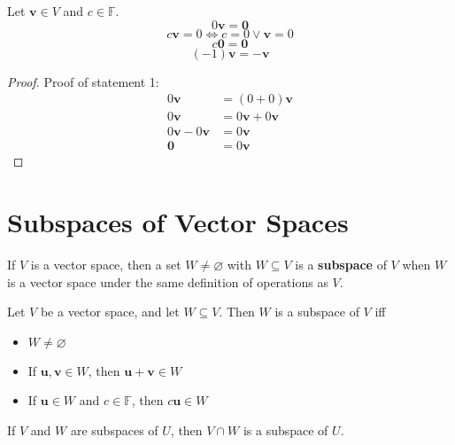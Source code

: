\begin{theorem}
    Let \(\mathbf{v} \in V\) and \(c\in\mathbb{F} \).
    \[
        0\mathbf{v} =\mathbf{0}
    \]
    \[
        c \mathbf{v} =0\Longleftrightarrow c=0\lor \mathbf{v} =0
    \]
    \[
        c\mathbf{0}=\mathbf{0}
    \]
    \[
        (-1)\mathbf{v} =-\mathbf{v} 
    \]
\end{theorem}
\begin{proof}
    Proof of statement 1:
\begin{align*}
    0\mathbf{v} &=(0+0)\mathbf{v}\\
    0\mathbf{v} &=0\mathbf{v} +0\mathbf{v} \\
    0\mathbf{v} -0\mathbf{v} &=0\mathbf{v} \\
    \mathbf{0}&=0\mathbf{v} 
\end{align*}
\end{proof}
\section{Subspaces of Vector Spaces}
\begin{definition}[Subspace]
    If \(V\) is a vector space, then a set \(W\neq \varnothing \) with \(W\subseteq V\) is a \textbf{subspace} of \(V\) when \(W\) is a vector space under the same definition of operations as \(V\).
\end{definition}
\begin{theorem}
    Let \(V\) be a vector space, and let \(W\subseteq V\). Then \(W\) is a subspace of \(V\) iff 
    \begin{itemize}
        \item \(W\neq \varnothing \) 
        \item If \(\mathbf{u} ,\mathbf{v} \in W\), then \(\mathbf{u} +\mathbf{v} \in W\)
        \item If \(\mathbf{u} \in W\) and \(c\in\mathbb{F} \), then \(c \mathbf{u} \in W\) 
    \end{itemize}
\end{theorem}
\begin{theorem}
    If \(V\) and \(W\) are subspaces of \(U\), then \(V\cap W\) is a subspace of \(U\).
\end{theorem}
